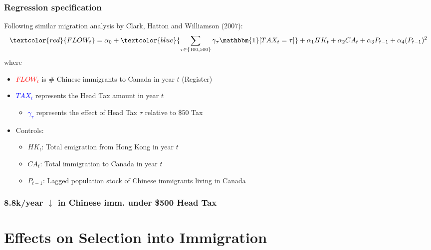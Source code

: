 \documentclass[xcolor=dvipsnames, compress, 12pt, aspectratio=169, handout]{beamer}
\begin{document}
\begin{frame}
    \frametitle{Regression specification}
    Following similar migration analysis by Clark, Hatton and Williamson (2007):
    \begin{equation*}
        \textcolor{red}{FLOW_{t}} = \alpha_0 + \textcolor{blue}{\sum_{\tau \in \{100, 500\}} \gamma_{\tau} \mathbbm{1}[TAX_t = \tau]} + \alpha_1 HK_t + \alpha_2 CA_t + \alpha_3 P_{t-1} + \alpha_4(P_{t-1})^2
    \end{equation*}
    where
    \begin{itemize}
        \item \textcolor{red}{$FLOW_t$} is \# Chinese immigrants to Canada in year $t$ (Register)
        \item \textcolor{blue}{$TAX_t$} represents the Head Tax amount in year $t$
        \begin{itemize}
            \item \textcolor{blue}{$\gamma_{\tau}$} represents the effect of Head Tax $\tau$ relative to \$50 Tax 
        \end{itemize}
        \item Controls: 
        \begin{itemize}
            \item $HK_t$: Total emigration from Hong Kong in year $t$
            \item $CA_t$: Total immigration to Canada in year $t$
            \item $P_{t-1}$: Lagged population stock of Chinese immigrants living in Canada
        \end{itemize}
    \end{itemize}
\end{frame}

\begin{frame}
    \label{reg_flow}
    \frametitle{8.8k/year $\downarrow$ in Chinese imm. under \$500 Head Tax}
    \centering
    \begin{table}
        \resizebox{0.7\textwidth}{!}{}
    \end{table}
    \hyperlink{flow_cf}{} \hyperlink{flow_placebo1}{}
\end{frame}

\section{Effects on Selection into Immigration}
\end{document}
